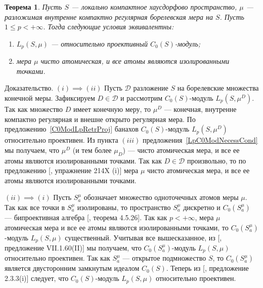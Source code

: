 \documentclass[12pt]{article}
\numberwithin{equation}{subsection}
\theoremstyle{plain}
\newtheorem{theorem}{Теорема}
\newenvironment{proof}{Доказательство.}{}
\begin{document}
\begin{fulltext}
    \begin{theorem}\label{ReflLpC0ModCrit} Пусть $S$ --- локально компактное
        хаусдорфово пространство, $\mu$ --- разложимая внутренне компактно
        регулярная борелевская мера на $S$. Пусть $1\leq p< +\infty$. Тогда
        следующие условия эквивалентны:

        \begin{enumerate}[label = (\roman*)]
            \item $L_p(S,\mu)$ --- относительно проективный $C_0(S)$-модуль;

            \item мера $\mu$ чисто атомическая, и все атомы являются
                  изолированными точками.
        \end{enumerate}
    \end{theorem}
    \begin{proof} $(i)\implies (ii)$ Пусть $\mathcal{D}$ разложение $S$ на
        борелевские множества конечной меры. Зафиксируем $D\in\mathcal{D}$ и
        рассмотрим $C_0(S)$-модуль $L_p(S,\mu^D)$. Так как множество $D$ имеет
        конечную меру, то $\mu^D$ --- конечная, внутренне компактно регулярная и
        внешне открыто регулярная мера. По предложению~\ref{C0ModLpRetrProj}
        банахов $C_0(S)$-модуль $L_p(S,\mu^D)$ относительно проективен. Из
        пункта $(iii)$ предложения~\ref{LpC0ModNecessCond} мы получаем, что
        $\mu^D$ (и тем более $\mu_D$) --- чисто атомическая мера, и все ее атомы
        являются изолированными точками. Так как $D\in\mathcal{D}$ произвольно,
        то по предложению [\cite{FremMeasTh2}, упражнение 214X (i)] мера $\mu$
        чисто атомическая мера, и все ее атомы являются изолированными точками.

        $(ii)\implies (i)$ Пусть $S_a^\mu$ обозначает множество одноточечных
        атомов меры $\mu$. Так как все точки в $S_a^\mu$ изолированы, то
        пространство $S_a^\mu$ дискретно и $C_0(S_a^\mu)$ --- бипроективная
        алгебра [\cite{HelHomolBanTopAlg}, теорема 4.5.26]. Так как $p<+\infty$,
        мера $\mu$  атомическая мера и все ее атомы являются изолированными
        точками, то $C_0(S_a^\mu)$-модуль $L_p(S,\mu)$ существенный. Учитывая
        все вышесказанное, из [\cite{HelBanLocConvAlg}, предложение
        VII.1.60(II)] мы получаем, что $C_0(S_a^\mu)$-модуль $L_p(S,\mu)$
        относительно проективен. Так как $S_a^\mu$ --- открытое подмножество
        $S$, то $C_0(S_a^\mu)$ является двусторонним замкнутым идеалом
        $C_0(S)$. Теперь из [\cite{RamsHomPropSemgroupAlg}, предложение
        2.3.3(i)] следует, что $C_0(S)$-модуль $L_p(S,\mu)$ относительно
        проективен.
    \end{proof}


\end{fulltext}
\end{document}
